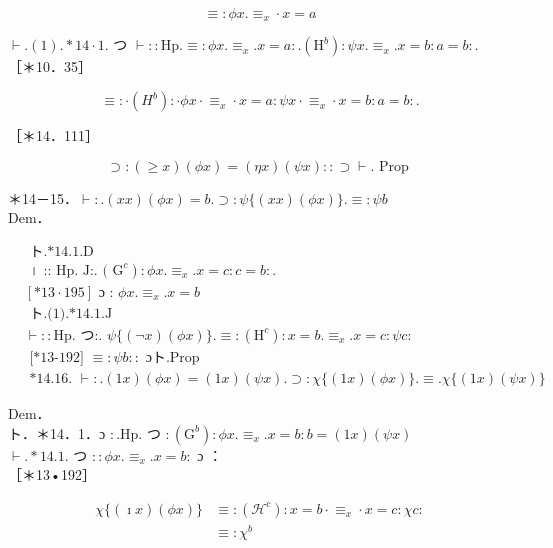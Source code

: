 \documentclass[10pt]{article}
\begin{document}
\begin{equation*}
\equiv: \phi x . \equiv_{x} \cdot x=a \tag{1}
\end{equation*}


$\vdash .(1) . * 14 \cdot 1$. つ $\vdash:: \mathrm{Hp} . \equiv: \phi x . \equiv_{x} . x=a: .\left(\mathrm{H}^{b}\right): \psi x . \equiv_{x} . x=b: a=b:$.\\
［＊10．35］

$$
\equiv: \cdot\left(H^{b}\right): \cdot \phi x \cdot \equiv_{x} \cdot x=a: \psi x \cdot \equiv_{x} \cdot x=b: a=b: .
$$

［＊14．111］

$$
\supset:(\geqslant x)(\phi x)=(\eta x)(\psi x):: \supset \vdash . \text { Prop }
$$

＊14－15．$\vdash: .(x x)(\phi x)=b . \supset: \psi\{(x x)(\phi x)\} . \equiv: \psi b$\\
Dem．


\begin{align*}
& \text { ト.*14.1.D } \\
& \text { । :: Hp. J:. ( } \left.\mathrm{G}^{c}\right): \phi x . \equiv_{x} . x=c: c=b: . \\
& {[* 13 \cdot 195] \text { ɔ : } \phi x . \equiv_{x} . x=b}  \tag{1}\\
& \text { ト.(1).*14.1.J } \\
& \vdash:: \mathrm{Hp} . \text { つ:. } \psi\{(\neg x)(\phi x)\} . \equiv:\left(\mathrm{H}^{c}\right): x=b . \equiv_{x} . x=c: \psi c: \\
& \text { [*13-192] } \equiv: \psi b:: \text { ɔト.Prop } \\
& \text { *14.16. } \vdash: .(1 x)(\phi x)=(1 x)(\psi x) . \supset: \chi\{(1 x)(\phi x)\} . \equiv . \chi\{(1 x)(\psi x)\}
\end{align*}


Dem．\\
ト．＊14．1．ɔ $: . \mathrm{Hp}$. つ $:\left(\mathrm{G}^{b}\right): \phi x . \equiv_{x} . x=b: b=(1 x)(\psi x)$\\
$\vdash . * 14.1$. つ $:: \phi x . \equiv_{x} . x=b:$ ɔ ：\\
［＊13•192］


\begin{align*}
\chi\{(\imath x)(\phi x)\} & \equiv:\left(\mathcal{H}^{c}\right): x=b \cdot \equiv_{x} \cdot x=c: \chi c:  \tag{1}\\
& \equiv: \chi^{b} \tag{2}
\end{align*}
\end{document}
